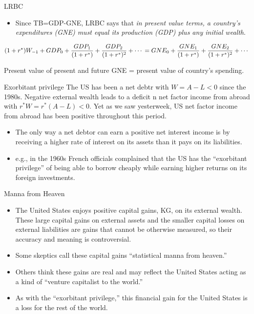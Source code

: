 \documentclass[
  ignorenonframetext,
]{beamer}
\providecommand{\tightlist}{%
  \setlength{\itemsep}{0pt}\setlength{\parskip}{0pt}}\usepackage{longtable,booktabs,array}
\begin{document}
\begin{frame}{LRBC}
\label{lrbc-1}
\begin{itemize}
\tightlist
\item
  Since TB=GDP-GNE, LRBC says that \emph{in present value terms, a
  country's expenditures (GNE) must equal its production (GDP) plus any
  initial wealth}.
\end{itemize}

\[
(1+r^*)W_{-1}+GDP_0+\frac{GDP_1}{(1+r^*)}+\frac{GDP_2}{(1+r^*)^2}+\cdots \\
=GNE_0+\frac{GNE_1}{(1+r^*)}+\frac{GNE_2}{(1+r^*)^2}+\cdots
\]

Present value of present and future GNE = present value of country's
spending.
\end{frame}

\begin{frame}{Exorbitant privilege}
\label{exorbitant-privilege}
The US has been a net debtr with \(W=A-L<0\) since the 1980s. Negative
external wealth leads to a deficit n net factor income from abroad with
\(r^*W=r^*(A-L)<0\). Yet as we saw yesterweek, US net factor income from
abroad has been positive throughout this period.

\begin{itemize}
\item
  The only way a net debtor can earn a positive net interest income is
  by receiving a higher rate of interest on its assets than it pays on
  its liabilities.
\item
  e.g., in the 1960s French officials complained that the US has the
  ``exorbitant privilege'' of being able to borrow cheaply while earning
  higher returns on its foreign investments.
\end{itemize}
\end{frame}

\begin{frame}{Manna from Heaven}
\label{manna-from-heaven}
\begin{itemize}
\item
  The United States enjoys positive capital gains, KG, on its external
  wealth. These large capital gains on external assets and the smaller
  capital losses on external liabilities are gains that cannot be
  otherwise measured, so their accuracy and meaning is controversial.
\item
  Some skeptics call these capital gains ``statistical manna from
  heaven.''
\item
  Others think these gains are real and may reflect the United States
  acting as a kind of ``venture capitalist to the world.''
\item
  As with the ``exorbitant privilege,'' this financial gain for the
  United States is a loss for the rest of the world.
\end{itemize}
\end{frame}
\end{document}
